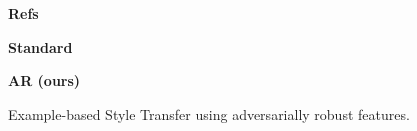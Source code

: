 \begin{figure}[t]
\hspace{0.5\textwidth}
\begin{minipage}{0.09\textwidth}
\centering\textbf{\scriptsize{Refs}}
\end{minipage}\begin{minipage}{0.225\textwidth}
\centering\textbf{\scriptsize{Standard}}
\end{minipage}\begin{minipage}{0.175\textwidth}
\centering\textbf{\scriptsize{AR (ours)}}
\end{minipage}\vspace{-2\baselineskip}

\hspace{0.125\textwidth}

\vspace{-0.2cm}
\caption{\label{fig:proposed_st}Example-based Style Transfer using adversarially robust features.}
\vspace{-0.2cm}
\end{figure}
